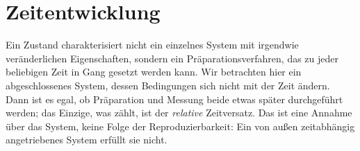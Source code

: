 \section{Zeitentwicklung}\label{c04.s2}

Ein Zustand charakterisiert nicht ein einzelnes System mit irgendwie veränderlichen Eigenschaften,
sondern ein Präparationsverfahren, das zu jeder beliebigen Zeit in Gang gesetzt werden kann. Wir
betrachten hier ein abgeschlossenes System, dessen Bedingungen sich nicht mit der Zeit ändern.
Dann ist es egal, ob Präparation und Messung beide etwas später durchgeführt werden; das
Einzige, was zählt, ist der \emph{relative} Zeitversatz. Das ist eine Annahme über das System,
keine Folge der Reproduzierbarkeit: Ein von außen zeitabhängig angetriebenes System erfüllt sie
nicht.

